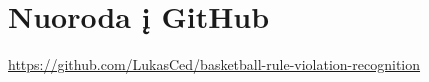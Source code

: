 \documentclass{VUMIFPSkursinis}
\begin{document}
\printbibliography[heading=bibintoc]  %

\appendix  %
\section{Nuoroda į GitHub}
\url{https://github.com/LukasCed/basketball-rule-violation-recognition}
\end{document}
